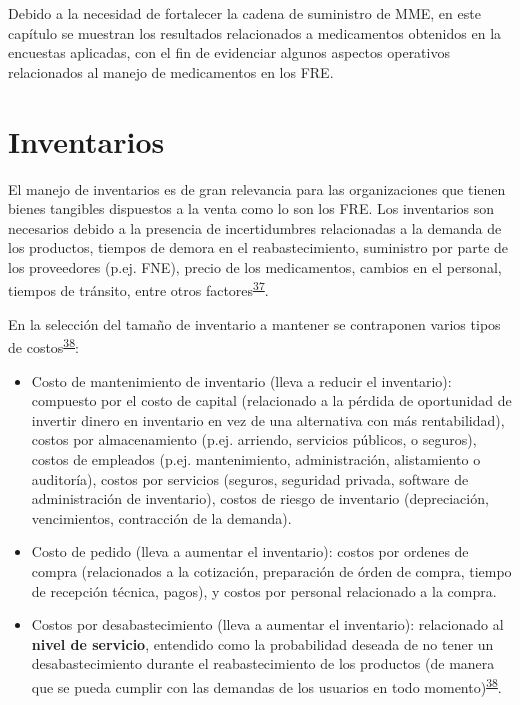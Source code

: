 \documentclass[
  oneside]{book}
\begin{document}
Debido a la necesidad de fortalecer la cadena de suministro de MME, en este capítulo se muestran los resultados relacionados a medicamentos obtenidos en la encuestas aplicadas, con el fin de evidenciar algunos aspectos operativos relacionados al manejo de medicamentos en los FRE.

\hypertarget{inventarios}{%
\section{Inventarios}\label{inventarios}}


El manejo de inventarios es de gran relevancia para las organizaciones que tienen bienes tangibles dispuestos a la venta como lo son los FRE. Los inventarios son necesarios debido a la presencia de incertidumbres relacionadas a la demanda de los productos, tiempos de demora en el reabastecimiento, suministro por parte de los proveedores (p.ej. FNE), precio de los medicamentos, cambios en el personal, tiempos de tránsito, entre otros factores\textsuperscript{\protect\hyperlink{ref-Nahmias2007}{37}}.

En la selección del tamaño de inventario a mantener se contraponen varios tipos de costos\textsuperscript{\protect\hyperlink{ref-Krajewski2016}{38}}:

\begin{itemize}
\item
  Costo de mantenimiento de inventario (lleva a reducir el inventario): compuesto por el costo de capital (relacionado a la pérdida de oportunidad de invertir dinero en inventario en vez de una alternativa con más rentabilidad), costos por almacenamiento (p.ej. arriendo, servicios públicos, o seguros), costos de empleados (p.ej. mantenimiento, administración, alistamiento o auditoría), costos por servicios (seguros, seguridad privada, software de administración de inventario), costos de riesgo de inventario (depreciación, vencimientos, contracción de la demanda).
\item
  Costo de pedido (lleva a aumentar el inventario): costos por ordenes de compra (relacionados a la cotización, preparación de órden de compra, tiempo de recepción técnica, pagos), y costos por personal relacionado a la compra.
\item
  Costos por desabastecimiento (lleva a aumentar el inventario): relacionado al \textbf{nivel de servicio}, entendido como la probabilidad deseada de no tener un desabastecimiento durante el reabastecimiento de los productos (de manera que se pueda cumplir con las demandas de los usuarios en todo momento)\textsuperscript{\protect\hyperlink{ref-Krajewski2016}{38}}.
\end{itemize}
\end{document}
